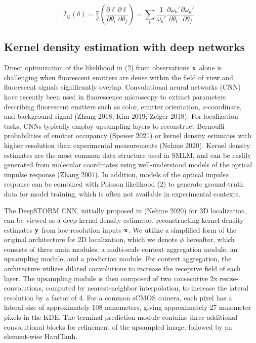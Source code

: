 \documentclass{article}
\begin{document}
\begin{equation}
\mathcal{I}_{ij}(\theta) = \underset{\theta}{\mathbb{E}}\left(\frac{\partial \ell}{\partial\theta_{i}}\frac{\partial\ell}{\partial\theta_{j}}\right) = \sum_{k}\frac{1}{\omega_{k}'}\frac{\partial \omega_{k}'}{\partial\theta_{i}}\frac{\partial \omega_{k}'}{\partial\theta_{j}}
\end{equation}

\subsection{Kernel density estimation with deep networks}

Direct optimization of the likelihood in (2) from observations $\bold{x}$ alone is challenging when fluorescent emitters are dense within the field of view and fluorescent signals significantly overlap. Convolutional neural networks (CNN) have recently been used in fluorescence microscopy to extract parameters describing fluorescent emitters such as color, emitter orientation, $z$-coordinate, and background signal (Zhang 2018; Kim 2019; Zelger 2018). For localization tasks, CNNs typically employ upsampling layers to reconstruct Bernoulli probabilities of emitter occupancy (Speiser 2021) or kernel density estimates with higher resolution than experimental measurements (Nehme 2020). Kernel density estimates are the most common data structure used in SMLM, and can be easlily generated from molecular coordinates using well-understood models of the optical impulse response (Zhang 2007). In addition, models of the optical impulse response can be combined with Poisson likelihood (2) to generate ground-truth data for model training, which is often not available in experimental contexts. 

The DeepSTORM CNN, initially proposed in (Nehme 2020) for 3D localization, can be viewed as a deep kernel density estimator, reconstructing kernel density estimates $\bold{y}$ from low-resolution inputs $\bold{x}$. We utilize a simplified form of the original architecture for 2D localization, which we denote $\phi$ hereafter, which consists of three main modules: a multi-scale context aggregation module, an upsampling module, and a prediction module. For context aggregation, the architecture utilizes dilated convolutions to increase the receptive field of each layer. The upsampling module is then composed of two consecutive 2x resize-convolutions, computed by nearest-neighbor interpolation, to increase the lateral resolution by a factor of 4. For a common sCMOS camera, each pixel has a lateral size of approximately 108 nanometers, giving approximately 27 nanometer pixels in the KDE. The terminal prediction module contains three additional convolutional blocks for refinement of the upsampled image, followed by an element-wise HardTanh. 
\end{document}
